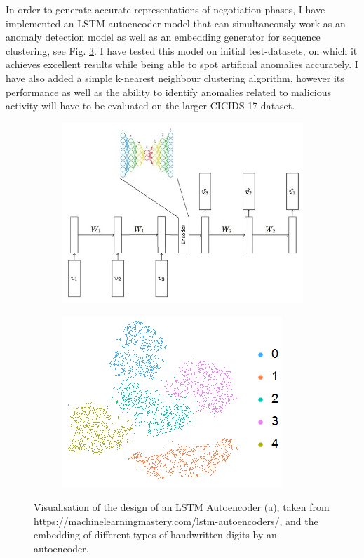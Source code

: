 \documentclass[a4paper,12pt,twoside]{article}
\begin{document}
In order to generate accurate representations of negotiation phases, I have implemented an LSTM-autoencoder model that can simultaneously work as an anomaly detection model as well as an embedding generator for sequence clustering, see Fig. \ref{LSTM2}. I have tested this model on initial test-datasets, on which it achieves excellent results while being able to spot artificial anomalies accurately. I have also added a simple k-nearest neighbour clustering algorithm, however its performance as well as the ability to identify anomalies related to malicious activity will have to be evaluated on the larger CICIDS-17 dataset.  

\begin{figure}\label{LSTM_Enc}
\centering
\begin{subfigure}[b]{0.5\textwidth}\label{LSTM1}
\includegraphics[width=\textwidth]{images/LSTM_Encoder.jpg}
\caption{}
\end{subfigure}
\begin{subfigure}[b]{0.34\textwidth}
\includegraphics[width=\textwidth]{images/MNIST.png}
\caption{}\label{LSTM2}
\end{subfigure}
\caption{Visualisation of the design of an LSTM Autoencoder (a), taken from https://machinelearningmastery.com/lstm-autoencoders/, and the embedding of different types of handwritten digits by an autoencoder.}
\end{figure}
\end{document}
